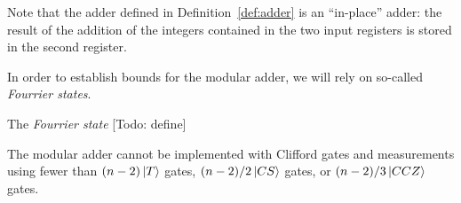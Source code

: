 \documentclass[12pt]{dalthesis}
\begin{document}
Note that the adder defined in Definition~\ref{def:adder} is an
``in-place'' adder: the result of the addition of the integers
contained in the two input registers is stored in the second register.

In order to establish bounds for the modular adder, we will rely on
so-called \emph{Fourrier states}.

\begin{definition}
  The \emph{Fourrier state} [Todo: define]
\end{definition}

\begin{proposition}
The modular adder cannot be implemented with Clifford gates and
measurements using fewer than $(n-2) \ket{T}$ gates, $(n-2)/2 \ket{CS}$
gates, or $(n-2)/3 \ket{CCZ}$ gates.
\end{proposition}
\end{document}
